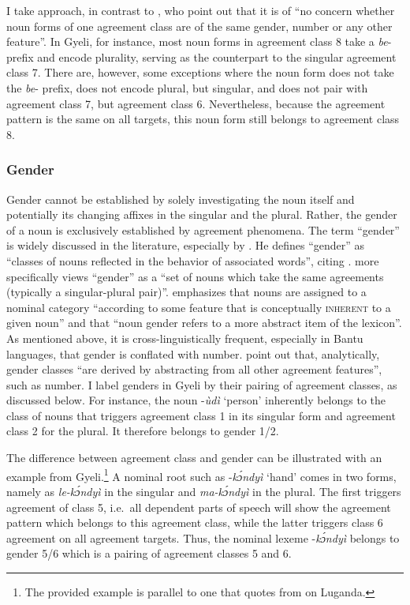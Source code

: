 I take  approach, in contrast to \citet{corbett91}, who point out that it is of ``no concern whether noun forms of one agreement class are of the same gender, number or any other feature''.  In Gyeli, for instance, most noun forms in agreement class 8 take a {\itshape be}- prefix and encode plurality, serving as the counterpart to the singular agreement class 7. There are, however, some exceptions where the noun form does not take the {\itshape be}- prefix, does not encode plural, but singular, and does not pair with agreement class 7, but agreement class 6. Nevertheless, because the agreement pattern is the same on all targets, this noun form still belongs to agreement class 8. 



\subsubsection*{Gender} Gender cannot be established by solely investigating the noun itself and potentially its changing affixes in the singular and the plural. Rather, the gender of a noun is exclusively established by agreement phenomena.
The term ``gender'' is widely discussed in the literature, especially by \citet[1]{corbett91}. He defines ``gender'' as ``classes of nouns reflected in the behavior of associated words'', citing \citet[231]{hockett58}. \citet[45]{corbett91} more specifically views ``gender'' as a ``set of nouns which take the same agreements (typically a singular-plural pair)''.  \citet[13]{guldemann2000} emphasizes that nouns are assigned to a nominal category ``according to some feature that is conceptually \textsc{inherent} to a  given noun'' and that ``noun gender refers to a more abstract item of the lexicon''.  As mentioned above, it is cross-linguistically frequent, especially in Bantu languages, that gender is conflated with number. \citet[98]{guldemann2019} point out that, analytically, gender classes ``are derived by abstracting from all other agreement features'', such as number. 
I label genders in Gyeli by their pairing of agreement classes, as discussed below. For instance, the noun -{\itshape ùdì} `person' inherently belongs to the class of nouns that triggers agreement class 1 in its singular form and agreement class 2 for the plural. It therefore belongs to gender 1/2.

The difference between agreement class and gender can be illustrated with an example from Gyeli.\footnote{The provided example is parallel to one that \citet[13]{guldemann2000} quotes from \citet[125]{nichols92} on Luganda.} A nominal root such as -{\itshape kɔ́ndyì} `hand' comes in two forms, namely as {\itshape le-kɔ́ndyì} in the singular and {\itshape ma-kɔ́ndyì} in the plural. The first triggers agreement of class 5, i.e.\ all dependent parts of speech will show the agreement pattern which belongs to this agreement class,  while the latter triggers class 6 agreement on all agreement targets. Thus, the nominal lexeme -{\itshape kɔ́ndyì} belongs to gender 5/6 which is a pairing of agreement classes 5 and 6. 



